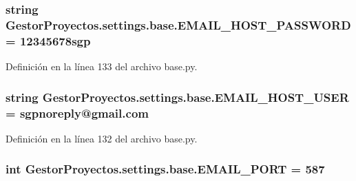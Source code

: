\subsubsection[{\texorpdfstring{E\+M\+A\+I\+L\+\_\+\+H\+O\+S\+T\+\_\+\+P\+A\+S\+S\+W\+O\+RD}{EMAIL_HOST_PASSWORD}}]{\setlength{\rightskip}{0pt plus 5cm}string Gestor\+Proyectos.\+settings.\+base.\+E\+M\+A\+I\+L\+\_\+\+H\+O\+S\+T\+\_\+\+P\+A\+S\+S\+W\+O\+RD = \textquotesingle{}12345678sgp\textquotesingle{}}\hypertarget{namespace_gestor_proyectos_1_1settings_1_1base_a2ddbe00334d2bfb39a4d7803a894808a}{}\label{namespace_gestor_proyectos_1_1settings_1_1base_a2ddbe00334d2bfb39a4d7803a894808a}


Definición en la línea 133 del archivo base.\+py.

\subsubsection[{\texorpdfstring{E\+M\+A\+I\+L\+\_\+\+H\+O\+S\+T\+\_\+\+U\+S\+ER}{EMAIL_HOST_USER}}]{\setlength{\rightskip}{0pt plus 5cm}string Gestor\+Proyectos.\+settings.\+base.\+E\+M\+A\+I\+L\+\_\+\+H\+O\+S\+T\+\_\+\+U\+S\+ER = \textquotesingle{}sgpnoreply@gmail.\+com\textquotesingle{}}\hypertarget{namespace_gestor_proyectos_1_1settings_1_1base_aae76b4d648bf8dd8cec056a06b191af3}{}\label{namespace_gestor_proyectos_1_1settings_1_1base_aae76b4d648bf8dd8cec056a06b191af3}


Definición en la línea 132 del archivo base.\+py.

\subsubsection[{\texorpdfstring{E\+M\+A\+I\+L\+\_\+\+P\+O\+RT}{EMAIL_PORT}}]{\setlength{\rightskip}{0pt plus 5cm}int Gestor\+Proyectos.\+settings.\+base.\+E\+M\+A\+I\+L\+\_\+\+P\+O\+RT = 587}\hypertarget{namespace_gestor_proyectos_1_1settings_1_1base_a31920e77a5f1e9004cafd753307560e5}{}\label{namespace_gestor_proyectos_1_1settings_1_1base_a31920e77a5f1e9004cafd753307560e5}


